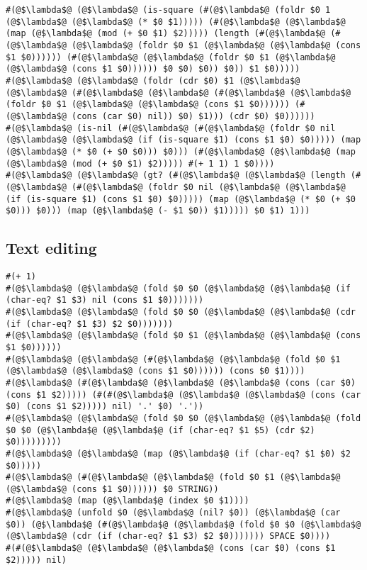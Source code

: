 \documentclass{article}
\begin{document}
\begin{lstlisting}
#(@$\lambda$@ (@$\lambda$@ (is-square (#(@$\lambda$@ (foldr $0 1 (@$\lambda$@ (@$\lambda$@ (* $0 $1))))) (#(@$\lambda$@ (@$\lambda$@ (map (@$\lambda$@ (mod (+ $0 $1) $2))))) (length (#(@$\lambda$@ (#(@$\lambda$@ (@$\lambda$@ (foldr $0 $1 (@$\lambda$@ (@$\lambda$@ (cons $1 $0)))))) (#(@$\lambda$@ (@$\lambda$@ (foldr $0 $1 (@$\lambda$@ (@$\lambda$@ (cons $1 $0)))))) $0 $0) $0)) $0)) $1 $0)))))
#(@$\lambda$@ (@$\lambda$@ (foldr (cdr $0) $1 (@$\lambda$@ (@$\lambda$@ (#(@$\lambda$@ (@$\lambda$@ (#(@$\lambda$@ (@$\lambda$@ (foldr $0 $1 (@$\lambda$@ (@$\lambda$@ (cons $1 $0)))))) (#(@$\lambda$@ (cons (car $0) nil)) $0) $1))) (cdr $0) $0))))))
#(@$\lambda$@ (is-nil (#(@$\lambda$@ (#(@$\lambda$@ (foldr $0 nil (@$\lambda$@ (@$\lambda$@ (if (is-square $1) (cons $1 $0) $0))))) (map (@$\lambda$@ (* $0 (+ $0 $0))) $0))) (#(@$\lambda$@ (@$\lambda$@ (map (@$\lambda$@ (mod (+ $0 $1) $2))))) #(+ 1 1) 1 $0))))
#(@$\lambda$@ (@$\lambda$@ (gt? (#(@$\lambda$@ (@$\lambda$@ (length (#(@$\lambda$@ (#(@$\lambda$@ (foldr $0 nil (@$\lambda$@ (@$\lambda$@ (if (is-square $1) (cons $1 $0) $0))))) (map (@$\lambda$@ (* $0 (+ $0 $0))) $0))) (map (@$\lambda$@ (- $1 $0)) $1))))) $0 $1) 1)))
\end{lstlisting}

\subsection{Text editing}
\begin{lstlisting}
#(+ 1)
#(@$\lambda$@ (@$\lambda$@ (fold $0 $0 (@$\lambda$@ (@$\lambda$@ (if (char-eq? $1 $3) nil (cons $1 $0)))))))
#(@$\lambda$@ (@$\lambda$@ (fold $0 $0 (@$\lambda$@ (@$\lambda$@ (cdr (if (char-eq? $1 $3) $2 $0)))))))
#(@$\lambda$@ (@$\lambda$@ (fold $0 $1 (@$\lambda$@ (@$\lambda$@ (cons $1 $0))))))
#(@$\lambda$@ (@$\lambda$@ (#(@$\lambda$@ (@$\lambda$@ (fold $0 $1 (@$\lambda$@ (@$\lambda$@ (cons $1 $0)))))) (cons $0 $1))))
#(@$\lambda$@ (#(@$\lambda$@ (@$\lambda$@ (@$\lambda$@ (cons (car $0) (cons $1 $2))))) (#(#(@$\lambda$@ (@$\lambda$@ (@$\lambda$@ (cons (car $0) (cons $1 $2))))) nil) '.' $0) '.'))
#(@$\lambda$@ (@$\lambda$@ (fold $0 $0 (@$\lambda$@ (@$\lambda$@ (fold $0 $0 (@$\lambda$@ (@$\lambda$@ (if (char-eq? $1 $5) (cdr $2) $0)))))))))
#(@$\lambda$@ (@$\lambda$@ (map (@$\lambda$@ (if (char-eq? $1 $0) $2 $0)))))
#(@$\lambda$@ (#(@$\lambda$@ (@$\lambda$@ (fold $0 $1 (@$\lambda$@ (@$\lambda$@ (cons $1 $0)))))) $0 STRING))
#(@$\lambda$@ (map (@$\lambda$@ (index $0 $1))))
#(@$\lambda$@ (unfold $0 (@$\lambda$@ (nil? $0)) (@$\lambda$@ (car $0)) (@$\lambda$@ (#(@$\lambda$@ (@$\lambda$@ (fold $0 $0 (@$\lambda$@ (@$\lambda$@ (cdr (if (char-eq? $1 $3) $2 $0))))))) SPACE $0))))
#(#(@$\lambda$@ (@$\lambda$@ (@$\lambda$@ (cons (car $0) (cons $1 $2))))) nil)
\end{lstlisting}
\end{document}
